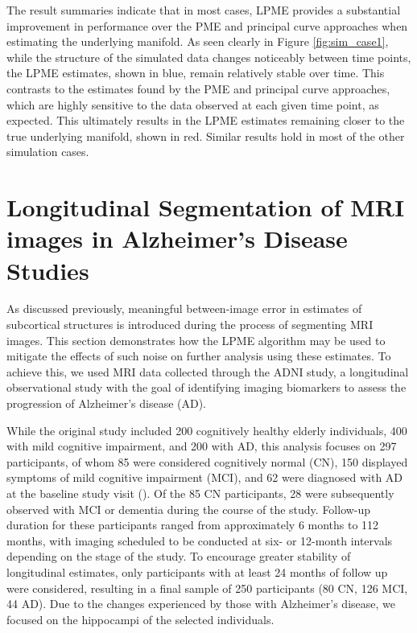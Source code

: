 \documentclass[11pt,reqno]{article}
\theoremstyle{definition}
\begin{document}
The result summaries indicate that in most cases, LPME provides a substantial improvement in performance over the PME and principal curve approaches when estimating the underlying manifold. As seen clearly in Figure \ref{fig:sim_case1}, while the structure of the simulated data changes noticeably between time points, the LPME estimates, shown in blue, remain relatively stable over time. This contrasts to the estimates found by the PME and principal curve approaches, which are highly sensitive to the data observed at each given time point, as expected. This ultimately results in the LPME estimates remaining closer to the true underlying manifold, shown in red. Similar results hold in most of the other simulation cases.


\section{Longitudinal Segmentation of MRI images in Alzheimer's Disease Studies}\label{s:application}

As discussed previously, meaningful between-image error in estimates of subcortical structures is introduced during the process of segmenting MRI images. This section demonstrates how the LPME algorithm may be used to mitigate the effects of such noise on further analysis using these estimates. To achieve this, we used MRI data collected through the ADNI study, a longitudinal observational study with the goal of identifying imaging biomarkers to assess the progression of Alzheimer's disease (AD).

While the original study included 200 cognitively healthy elderly individuals, 400 with mild cognitive impairment, and 200 with AD, this analysis focuses on 297 participants, of whom 85 were considered cognitively normal (CN), 150 displayed symptoms of mild cognitive impairment (MCI), and 62 were diagnosed with AD at the baseline study visit (\cite{jack2008adni}). Of the 85 CN participants, 28 were subsequently observed with MCI or dementia during the course of the study. Follow-up duration for these participants ranged from approximately 6 months to 112 months, with imaging scheduled to be conducted at six- or 12-month intervals depending on the stage of the study. To encourage greater stability of longitudinal estimates, only participants with at least 24 months of follow up were considered, resulting in a final sample of 250 participants (80 CN, 126 MCI, 44 AD). Due to the changes experienced by those with Alzheimer's disease, we focused on the hippocampi of the selected individuals.
\end{document}
